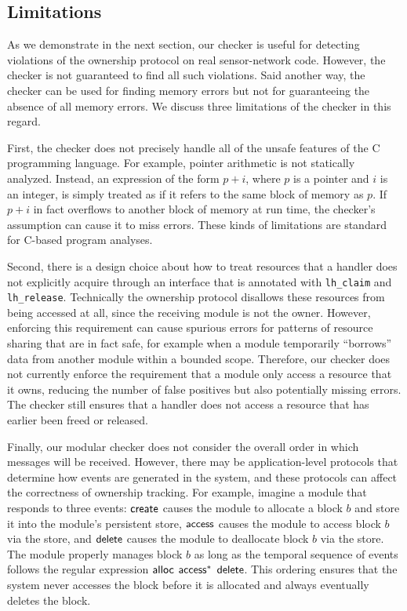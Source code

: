 \subsection{Limitations}

As we demonstrate in the next section, our checker is useful for
detecting violations of the ownership protocol on real sensor-network
code.  However, the checker is not guaranteed to find all such
violations.  Said another way, the checker can be used for finding
memory errors but not for guaranteeing the absence of all memory
errors.  We discuss three limitations of the checker in this regard.

First, the checker does not precisely handle all of the unsafe
features of the C programming language.  For example, pointer
arithmetic is not statically analyzed.  Instead, an expression of the
form $p+i$, where $p$ is a pointer and $i$ is an integer, is simply
treated as if it refers to the same block of memory as $p$.  If $p+i$
in fact overflows to another block of memory at run time, the
checker's assumption can cause it to miss errors.  These kinds of
limitations are standard for C-based program analyses.

Second, there is a design choice about how to treat resources that a
handler does not explicitly acquire through an interface that is
annotated with {\tt lh\_claim} and {\tt lh\_release}.  Technically the
ownership protocol disallows these resources from being accessed at
all, since the receiving module is not the owner.  However, enforcing
this requirement can cause spurious errors for patterns of resource
sharing that are in fact safe, for example when a module temporarily
``borrows'' data from another module within a bounded scope.
Therefore, our checker does not currently enforce the requirement that
a module only access a resource that it owns, reducing the number of
false positives but also potentially missing errors.  The checker
still ensures that a handler does not access a resource that has
earlier been freed or released.

%
Finally, our modular checker does not consider the overall order in
which messages will be received.  However, there may be
application-level protocols that determine how events are generated in
the system, and these protocols can affect the correctness of
ownership tracking.
%
For example, imagine a module that responds to three events: ${\mathsf{create}}$
causes the module to allocate a block $b$ and store it into the
module's persistent store, ${\mathsf{access}}$ causes the module to access block
$b$ via the  store, and ${\mathsf{delete}}$ causes the module to deallocate
block $b$ via the store.  The module properly manages block $b$ as
long as the temporal sequence of events follows the regular expression
${\mathsf{alloc}}$ ${\mathsf{access}}^*$ ${\mathsf{delete}}$.  This ordering ensures that the system
never accesses the block before it is allocated and always eventually
deletes the block.

